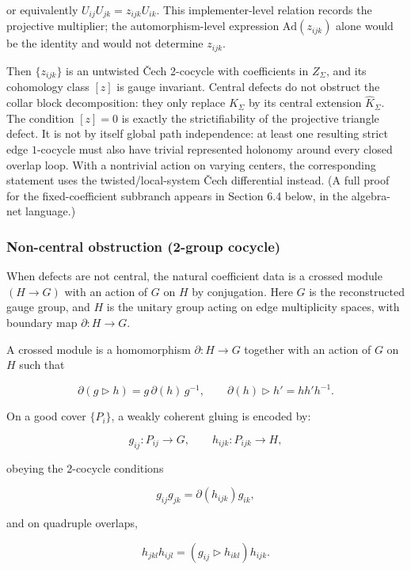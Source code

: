 or equivalently \(U_{ij}U_{jk}=z_{ijk}U_{ik}\). This implementer-level relation records the
projective multiplier; the automorphism-level expression \(\mathrm{Ad}(z_{ijk})\) alone would be
the identity and would not determine \(z_{ijk}\).

Then \(\{z_{ijk}\}\) is an untwisted \v{C}ech 2-cocycle with coefficients in \(Z_\Sigma\), and its cohomology class \([z]\) is gauge invariant. Central defects do not obstruct the collar block decomposition: they only replace \(K_\Sigma\) by its central extension \(\widehat K_\Sigma\). The condition \([z]=0\) is exactly the strictifiability of the projective triangle defect. It is not by itself global path independence: at least one resulting strict edge \(1\)-cocycle must also have trivial represented holonomy around every closed overlap loop. With a nontrivial action on varying centers, the corresponding statement uses the twisted/local-system \v{C}ech differential instead. (A full proof for the fixed-coefficient subbranch appears in Section 6.4 below, in the algebra-net language.)

\subsubsection{Non-central obstruction (2-group cocycle)}\label{34-non-central-obstruction-2-group-cocycle}

When defects are not central, the natural coefficient data is a crossed module \((H \to G)\) with an action of \(G\) on \(H\) by conjugation. Here \(G\) is the reconstructed gauge group, and \(H\) is the unitary group acting on edge multiplicity spaces, with boundary map \(\partial: H \to G\).

A crossed module is a homomorphism \(\partial: H \to G\) together with an action of \(G\) on \(H\) such that

\[
\partial(g \triangleright h) = g\,\partial(h)\,g^{-1},
\qquad
\partial(h) \triangleright h' = h h' h^{-1}.
\]

On a good cover \(\{P_i\}\), a weakly coherent gluing is encoded by:

\[
g_{ij}: P_{ij} \to G,\qquad h_{ijk}: P_{ijk} \to H,
\]

obeying the 2-cocycle conditions

\[
g_{ij} g_{jk} = \partial(h_{ijk}) g_{ik},
\]

and on quadruple overlaps,

\[
h_{jkl} h_{ijl} = (g_{ij} \triangleright h_{ikl}) h_{ijk}.
\]

